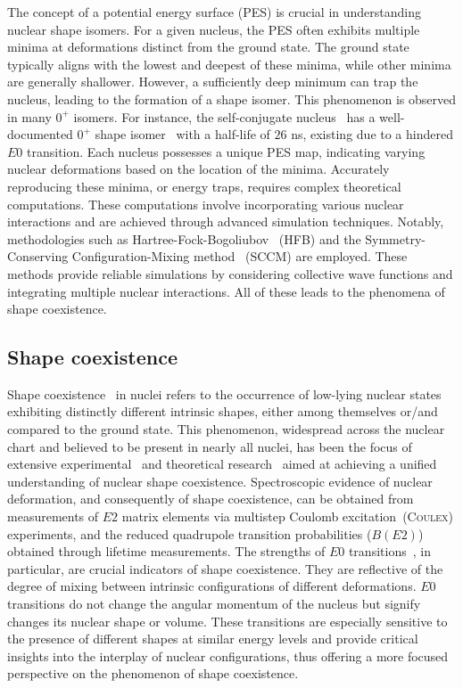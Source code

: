 The concept of a potential energy surface (\textsc{PES}) is crucial in understanding nuclear shape isomers. For a given nucleus, the \textsc{PES} often exhibits multiple minima at deformations distinct from the ground state. The ground state typically aligns with the lowest and deepest of these minima, while other minima are generally shallower. However, a sufficiently deep minimum can trap the nucleus, leading to the formation of a shape isomer. This phenomenon is observed in many $0^+$ isomers. For instance, the self-conjugate nucleus \, has a well-documented $0^+$ shape isomer~\cite{72krshapeisomer} with a half-life of $26$ ns, existing due to a hindered $E0$ transition.
\newpar
Each nucleus possesses a unique \textsc{PES} map, indicating varying nuclear deformations based on the location of the minima. Accurately reproducing these minima, or energy traps, requires complex theoretical computations. These computations involve incorporating various nuclear interactions and are achieved through advanced simulation techniques. Notably, methodologies such as Hartree-Fock-Bogoliubov~\cite{hfbt} (\textsc{HFB}) and the Symmetry-Conserving Configuration-Mixing method~\cite{sccm} (\textsc{SCCM}) are employed. These methods provide reliable simulations by considering collective wave functions and integrating multiple nuclear interactions. All of these leads to the phenomena of shape coexistence.
\subsection{Shape coexistence}\label{subsec:intro:shape_coexistence}
Shape coexistence~\cite{shapeCoex} in nuclei refers to the occurrence of low-lying nuclear states exhibiting distinctly different intrinsic shapes, either among themselves or/and compared to the ground state.
This phenomenon, widespread across the nuclear chart and believed to be present in nearly all nuclei, has been the focus of extensive experimental~\cite{GARRETT2022} and theoretical research~\cite{PhysRevC.107.024308} aimed at achieving a unified understanding of nuclear shape coexistence.
\newpar
Spectroscopic evidence of nuclear deformation, and consequently of shape coexistence, can be obtained from measurements of $E2$ matrix elements via multistep Coulomb excitation~(\textsc{Coulex}) \cite{Görgen_2016} experiments, and the reduced quadrupole transition probabilities ($B(E2)$) obtained through lifetime measurements. The strengths of $E0$ transitions~\cite{Kibedi-2022}, in particular, are crucial indicators of shape coexistence. They are reflective of the degree of mixing between intrinsic configurations of different deformations. $E0$ transitions do not change the angular momentum of the nucleus but signify changes its nuclear shape or volume. These transitions are especially sensitive to the presence of different shapes at similar energy levels and provide critical insights into the interplay of nuclear configurations, thus offering a more focused perspective on the phenomenon of shape coexistence. 

